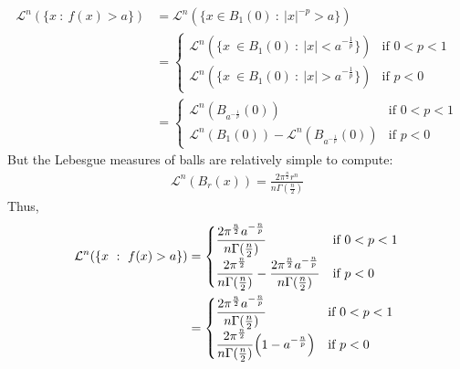 \documentclass[12pt]{article}
\theoremstyle{plain}
\begin{document}
\begin{enumerate}[(i)]
        \begin{align*}
            \mathcal{L}^n(\{x\ :\ f(x) > a\}) &= \mathcal{L}^n(\{x \in B_1(0)\ :\ |x|^{-p} > a\}) \\
            &= \begin{cases}
                \mathcal{L}^n(\{x\ \in B_1(0)\ :\ |x| < a^{-\frac{1}{p}}\}) & \text{if $0 < p < 1$} \\
                \mathcal{L}^n(\{x\ \in B_1(0)\ :\ |x| > a^{-\frac{1}{p}}\}) & \text{if $p < 0$}
            \end{cases} \\
            &= \begin{cases}
                \mathcal{L}^n(B_{a^{-\frac{1}{p}}}(0)) & \text{if $0 < p < 1$} \\
                \mathcal{L}^n(B_1(0)) - \mathcal{L}^n(B_{a^{-\frac{1}{p}}}(0)) & \text{if $p < 0$}
            \end{cases}
        \end{align*}
        But the Lebesgue measures of balls are relatively simple to compute:
        \begin{align*}
            \mathcal{L}^n(B_r(x)) = \frac{2\pi^{\frac{n}{2}}r^n}{n\Gamma(\frac{n}{2})}
        \end{align*}
        Thus,
        \begin{align*}
            \mathcal{L}^n(\{x\ :\ f(x) > a\}) &= \begin{cases}
                \dfrac{2\pi^{\frac{n}{2}}a^{-\frac{n}{p}}}{n\Gamma(\frac{n}{2})} & \text{if $0 < p < 1$} \\
                \dfrac{2\pi^{\frac{n}{2}}}{n\Gamma(\frac{n}{2})} - \dfrac{2\pi^{\frac{n}{2}}a^{-\frac{n}{p}}}{n\Gamma(\frac{n}{2})} & \text{if $p < 0$}
            \end{cases} \\
            &= \begin{cases}
                \dfrac{2\pi^{\frac{n}{2}}a^{-\frac{n}{p}}}{n\Gamma(\frac{n}{2})} & \text{if $0 < p < 1$} \\
                \dfrac{2\pi^{\frac{n}{2}}}{n\Gamma(\frac{n}{2})}\qty(1 - a^{-\frac{n}{p}}) & \text{if $p < 0$}
            \end{cases}
        \end{align*}
\end{enumerate}
\end{document}
